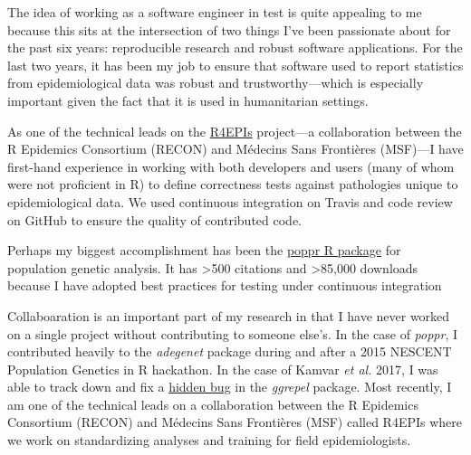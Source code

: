 

The idea of working as a software engineer in test is quite appealing to me
because this sits at the intersection of two things I've been passionate about
for the past six years: reproducible research and robust software applications.
For the last two years, it has been my job to ensure that software used to
report statistics from epidemiological data was robust and trustworthy---which
is especially important given the fact that it is used in humanitarian
settings.  

\vspace{1ex}

As one of the technical leads on the \href{https://r4epis.netlify.com}{R4EPIs}
project---a collaboration between the R Epidemics Consortium (RECON) and
M\'{e}decins Sans Fronti\`{e}res (MSF)---I have first-hand experience in
working with both developers and users (many of whom were not proficient in R)
to define correctness tests against pathologies unique to epidemiological data.
We used continuous integration on Travis and code review on GitHub to ensure
the quality of contributed code.

Perhaps my biggest accomplishment has been the
\href{https://grunwaldlab.github.io/poppr}{poppr R package} for population
genetic analysis. It has \textgreater500 citations and \textgreater85,000
downloads because I have adopted best practices for testing under continuous 
integration 


Collaboaration is an important part of my research in that I have never worked
on a single project without contributing to someone else's. In the case of
\textit{poppr}, I contributed heavily to the \textit{adegenet} package during
and after a 2015 NESCENT Population Genetics in R hackathon. In the case of
Kamvar \textit{et al.} 2017, I was able to track down and fix a
\href{https://github.com/slowkow/ggrepel/issues/72}{hidden bug} in the
\textit{ggrepel} package. Most recently, I am one of the technical leads on a
collaboration between the R Epidemics Consortium (RECON) and M\'{e}decins Sans
Fronti\`{e}res (MSF) called R4EPIs where we work on standardizing analyses and
training for field epidemiologists.  

